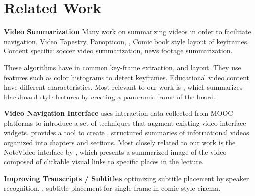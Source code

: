 \section{Related Work}

\textbf{Video Summarization}
Many work on summarizing videos in order to facilitate navigation. \cite{barnes2010video} Video Tapestry, \cite{jackson2013panopticon} Panopticon, \cite{uchihashi1999video}, \cite{hwang2006cinema}\cite{boreczky2000interactive} Comic book style layout of keyframes. Content specific:\cite{ekin2003automatic} soccer video summarization, \cite{} news footage summarization.
 
These algorithms have in common key-frame extraction, and layout. They use features such as color histograms to detect keyframes. Educational video content have different characteristics.
Most relevant to our work is \cite{choudary2007summarization}, which summarizes blackboard-style lectures by creating a panoramic frame of the board.

\textbf{Video Navigation Interface}
\cite{kim2014data} uses interaction data collected from MOOC platforms to introduce a set of techniques that augment existing video interface widgets. \cite{pavel2014video} provides a tool to create , structured summaries of informational videos organized into chapters and sections. 
Most closely related to our work is the NoteVideo interface by \cite{monserrat2013notevideo}, which presents a summarized image of the video composed of clickable visual links to specific places in the lecture.

\textbf{Improving Transcripts / Subtitles}
\cite{hu2015speaker} optimizing subtitle placement by speaker recognition. \cite{kurlander1996comic}, \cite{chun2006automated} subtitle placement for single frame in comic style cinema.



